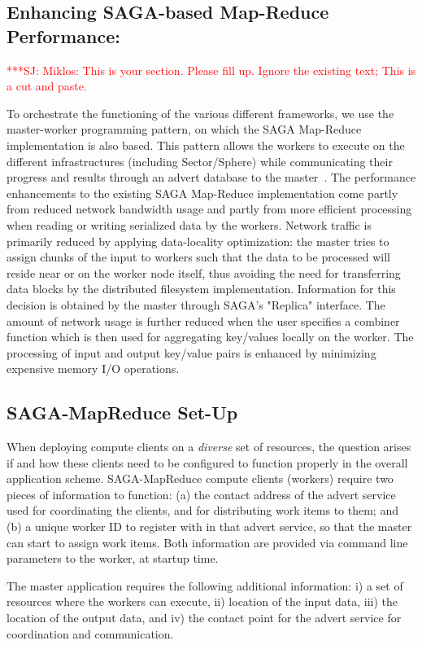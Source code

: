 \documentclass[conference,final]{IEEEtran}
\newcommand{\jhanote}[1]{ {\textcolor{red} { ***SJ: #1 }}}
\newcommand{\jhanote}[1]{}
\newcommand{\sagamapreduce }{SAGA-MapReduce }
\newcommand{\I}[1]{\textit{#1}}
\begin{document}
\subsection{Enhancing SAGA-based Map-Reduce Performance:} 

\jhanote{Miklos: This is your section. Please fill up. Ignore the
  existing text; This is a cut and paste. }

To orchestrate the functioning of the various different frameworks, we
use the master-worker programming pattern, on which the SAGA
Map-Reduce implementation is also based. This pattern allows the
workers to execute on the different infrastructures (including
Sector/Sphere) while communicating their progress and results through
an advert database to the master~\cite{saga_ccgrid09}. The performance
enhancements to the existing SAGA Map-Reduce implementation come
partly from reduced network bandwidth usage and partly from more
efficient processing when reading or writing serialized data by the
workers. Network traffic is primarily reduced by applying
data-locality optimization: the master tries to assign chunks of the
input to workers such that the data to be processed will reside near
or on the worker node itself, thus avoiding the need for transferring
data blocks by the distributed filesystem implementation. Information
for this decision is obtained by the master through SAGA's "Replica"
interface. The amount of network usage is further reduced when the
user specifies a combiner function which is then used for aggregating
key/values locally on the worker. The processing of input and output
key/value pairs is enhanced by minimizing expensive memory I/O
operations.

\subsection{\sagamapreduce Set-Up}
When deploying compute clients on a \I{diverse} set of resources, the
question arises if and how these clients need to be configured to
function properly in the overall application scheme.  \sagamapreduce
compute clients (workers) require two pieces of information to
function: (a) the contact address of the advert service used for
coordinating the clients, and for distributing work items to them; and
(b) a unique worker ID to register with in that advert service, so
that the master can start to assign work items.  Both information are
provided via command line parameters to the worker, at startup time.

The master application requires the following additional information:
i) a set of resources where the workers can execute, ii) location of
the input data, iii) the location of the output data, and iv) the
contact point for the advert service for coordination and
communication.  
\end{document}
